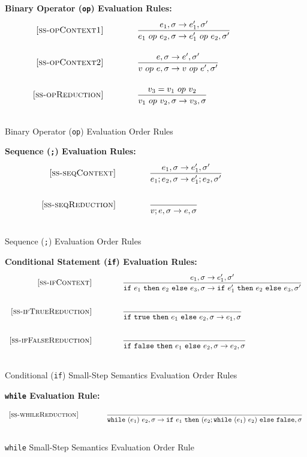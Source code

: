 \documentclass{article}
\newcommand{\ife}[3]{\mbox{\tt if}~{#1}~\mbox{\tt then}~{#2}~\mbox{\tt else}~{#3}}
\newcommand{\whilee}[2]{\mbox{\tt while}~(#1)~#2}
\newcommand{\true}{\mbox{\tt true}}
\newcommand{\false}{\mbox{\tt false}}
\begin{document}
\begin{figure}[H]\label{fig:opRules}
\caption{Binary Operator ({\tt op}) Evaluation Order Rules}
{\bf Binary Operator ({\tt op}) Evaluation Rules:}
\[
\\
\begin{array}{r@{\qquad\qquad}l}
\ssrule{ss-opContext1}{
  \sstep{e_1}{\sigma}{e_1'}{\sigma'}
}{
  \sstep{e_1~op~e_2}{\sigma}{e_1'~op~e_2}{\sigma'}
}
\ssrule{ss-opContext2}{
  \sstep{e}{\sigma}{e'}{\sigma'}
}{
  \sstep{v~op~e}{\sigma}{v~op~e'}{\sigma'}
}
\ssrule{ss-opReduction}{
  v_3 = v_1 ~op~ v_2
}{
  \sstep{v_1~op~v_2}{\sigma}{v_3}{\sigma}
}
\end{array}
\]
\end{figure}

\begin{figure}[H]\label{fig:seqRules}
\caption{Sequence ({\tt ;}) Evaluation Order Rules}
{\bf Sequence ({\tt ;}) Evaluation Rules:}
\[
\\
\begin{array}{r@{\qquad\qquad}l}
\ssrule{ss-seqContext}{
  \sstep{e_1}{\sigma}{e_1'}{\sigma'}
}{
  \sstep{e_1 ; e_2}{\sigma}{e_1' ; e_2}{\sigma'}
}
\ssrule{ss-seqReduction}{
}{
  \sstep{v ; e}{\sigma}{e}{\sigma}
}
\end{array}
\]
\end{figure}

\begin{figure}[H]\label{fig:condRules}
\caption{Conditional ({\tt if}) Small-Step Semantics Evaluation Order Rules}
{\bf Conditional Statement ({\tt if}) Evaluation Rules:}
\[
\\
\begin{array}{r@{\qquad\qquad}l}
\ssrule{ss-ifContext}{
  \sstep{e_1}{\sigma}{e_1'}{\sigma'}
}{
  \sstep{\ife{e_1}{e_2}{e_3}}{\sigma}{\ife{e_1'}{e_2}{e_3}}{\sigma'}
}
\ssrule{ss-ifTrueReduction}{
}{
  \sstep{\ife{\true}{e_1}{e_2}}{\sigma}{e_1}{\sigma}
}
\ssrule{ss-ifFalseReduction}{
}{
  \sstep{\ife{\false}{e_1}{e_2}}{\sigma}{e_2}{\sigma}
}
\end{array}
\]
\end{figure}

\begin{figure}[H]\label{fig:whileRules}
\caption{{\tt while} Small-Step Semantics Evaluation Order Rule}
{\bf {\tt while} Evaluation Rule:} 
\[
\\
\begin{array}{r@{\qquad\qquad}l}
\ssrule{ss-whileReduction}{
}{
  \sstep{\whilee{e_1}{e_2}}{\sigma}{\ife{e_1}{(e_2;\whilee{e_1}{e_2})}{\false}}{\sigma}
}
\end{array}
\]
\end{figure}
\end{document}
